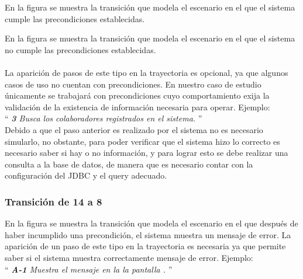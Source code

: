 En la figura  se muestra la transición que modela el escenario en el que el sistema cumple las precondiciones establecidas.
  
   
En la figura  se muestra la transición que modela el escenario en el que el sistema no cumple las precondiciones establecidas.\\\\
  
  
 La aparición de pasos de este tipo en la trayectoria es opcional, ya que algunos casos de uso no cuentan con precondiciones. En nuestro caso de estudio únicamente se trabajará con precondiciones cuyo comportamiento exija la validación de la existencia de información necesaria para operar. Ejemplo:\\

``{\it
     {\bf 3} \UCsist Busca los colaboradores registrados en el sistema. 
 }''\\
	
	Debido a que el paso anterior es realizado por el sistema no es necesario simularlo, no obstante, para poder verificar que el sistema hizo lo correcto es necesario saber si hay o no información, y para lograr esto se debe realizar una consulta a la base de datos, de manera que es necesario contar con la configuración del JDBC y el query adecuado.\\
	

\subsubsection{Transición de 14 a 8}
  
En la figura  se muestra la transición que modela el escenario en el que después de haber incumplido una precondición, el sistema muestra un mensaje de error. 
La aparición de un paso de este tipo en la trayectoria es necesaria ya que  permite saber si el sistema muestra correctamente mensaje de error. Ejemplo:\\

``{\it
    {\bf A-1} \UCsist Muestra el mensaje  en la la pantalla .
}''\\
	
